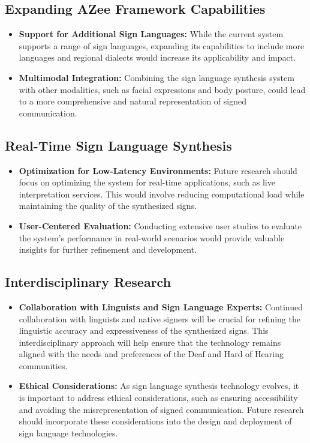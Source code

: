 \documentclass[../../main.tex]{subfiles}
\begin{document}
\subsection{Expanding AZee Framework Capabilities}

\begin{itemize}
    \item \textbf{Support for Additional Sign Languages:} While the current system supports a range of sign languages, expanding its capabilities to include more languages and regional dialects would increase its applicability and impact.
    
    \item \textbf{Multimodal Integration:} Combining the sign language synthesis system with other modalities, such as facial expressions and body posture, could lead to a more comprehensive and natural representation of signed communication.
\end{itemize}

\subsection{Real-Time Sign Language Synthesis}

\begin{itemize}
    \item \textbf{Optimization for Low-Latency Environments:} Future research should focus on optimizing the system for real-time applications, such as live interpretation services. This would involve reducing computational load while maintaining the quality of the synthesized signs.
    
    \item \textbf{User-Centered Evaluation:} Conducting extensive user studies to evaluate the system’s performance in real-world scenarios would provide valuable insights for further refinement and development.
\end{itemize}

\subsection{Interdisciplinary Research}

\begin{itemize}
    \item \textbf{Collaboration with Linguists and Sign Language Experts:} Continued collaboration with linguists and native signers will be crucial for refining the linguistic accuracy and expressiveness of the synthesized signs. This interdisciplinary approach will help ensure that the technology remains aligned with the needs and preferences of the Deaf and Hard of Hearing communities.
    
    \item \textbf{Ethical Considerations:} As sign language synthesis technology evolves, it is important to address ethical considerations, such as ensuring accessibility and avoiding the misrepresentation of signed communication. Future research should incorporate these considerations into the design and deployment of sign language technologies.
\end{itemize}
\end{document}
